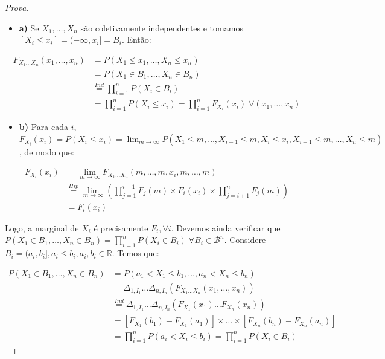 \documentclass[
]{article}
\providecommand{\tightlist}{%
  \setlength{\itemsep}{0pt}\setlength{\parskip}{0pt}}
\theoremstyle{definition}
\theoremstyle{definition}
\theoremstyle{definition}
\theoremstyle{definition}
\theoremstyle{remark}
\begin{document}
\begin{proof}[Prova]
\leavevmode

\begin{itemize}
\tightlist
\item
  \textbf{a)} Se \(X_{1},\ldots,X_{n}\) são coletivamente independentes e tomamos \([X_{i} \le x_{i}] = (-\infty, x_{i}] = B_{i}\). Então:
\end{itemize}

\begin{align*}
F_{X_{1} \ldots X_{n}}(x_{1},\ldots,x_{n}) &= P(X_{1} \le x_{1}, \ldots, X_{n} \le x_{n}) \\
&= P(X_{1} \in B_{1},\ldots, X_{n} \in B_{n}) \\
&\stackrel{Ind}{=} \prod_{i=1}^{n}P(X_{i} \in B_{i}) \\
&= \prod_{i=1}^{n}P(X_{i} \le x_{i}) = \prod_{i=1}^{n}F_{X_{i}}(x_{i}) \; \forall (x_{1},\ldots,x_{n})
\end{align*}

\begin{itemize}
\tightlist
\item
  \textbf{b)} Para cada \(i\), \(F_{X_{i}}(x_{i}) = P(X_{i} \le x_{i}) = \lim_{m \to \infty}P(X_{1} \le m, \ldots, X_{i-1} \le m, X_{i} \le x_{i}, X_{i+1} \le m, \ldots, X_{n} \le m)\), de modo que:
\end{itemize}

\begin{align*}
F_{X_{i}}(x_{i}) &= \lim_{m \to \infty}F_{X_{1}\ldots X_{n}}(m,\ldots,m,x_{i},m,\ldots,m) \\
&\stackrel{Hip}{=} \lim_{m \to \infty}\left(\prod_{j=1}^{i-1}F_{j}(m) \times F_{i}(x_{i}) \times \prod_{j=i+1}^{n}F_{j}(m)\right) \\
&= F_{i}(x_i)
\end{align*}

Logo, a marginal de \(X_{i}\) é precisamente \(F_{i}, \forall i\). Devemos ainda verificar que \(P(X_{1} \in B_{1}, \ldots, X_{n} \in B_{n}) = \prod_{i=1}^{n}P(X_{i} \in B_{i}) \; \forall B_{i} \in \mathcal{B}^{n}\). Considere \(B_{i} = (a_{i},b_{i}], a_{i} \le b_{i}, a_{i}, b_{i} \in \mathbb{R}\). Temos que:

\begin{align*}
P(X_{1} \in B_{1}, \ldots, X_{n} \in B_{n}) &= P(a_{1} < X_{1} \le b_{1}, \ldots, a_{n} < X_{n} \le b_{n}) \\
&= \Delta_{1,I_{1}} \ldots \Delta_{n,I_{n}}\left(F_{X_{1} \ldots X_{n}}(x_{1},\ldots,x_{n})\right) \\
&\stackrel{Ind}{=} \Delta_{1,I_{1}} \ldots \Delta_{n,I_{n}}(F_{X_{1}}(x_{1})\ldots F_{X_{n}}(x_{n})) \\
&= [F_{X_{1}}(b_{1}) - F_{X_{1}}(a_{1})] \times \ldots \times [F_{X_{n}}(b_{n}) - F_{X_{n}}(a_{n})] \\
&= \prod_{i=1}^{n}P(a_{i} < X_{i} \le b_{i}) = \prod_{i=1}^{n}P(X_{i} \in B_{i})
\end{align*}

\end{proof}
\end{document}
